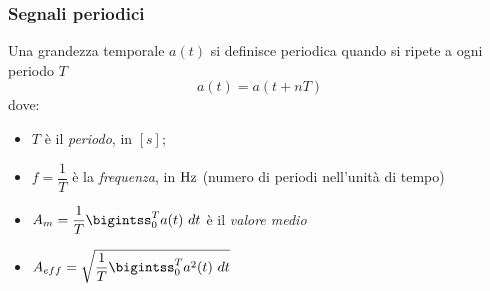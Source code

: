\documentclass{article}
\begin{document}
\subsubsection{Segnali periodici}
Una grandezza temporale $a(t)$ si definisce periodica quando si ripete a ogni periodo $T$
\[a(t)=a(t+nT) \tag*{$\forall t$}\]
dove:
\begin{itemize}
    \item $T$ è il \textit{periodo}, in $[s]$;
    \item $f=\dfrac{1}{T}$ è la \textit{frequenza}, in $\text{Hz}$ (numero di periodi nell'unità di tempo)
    \item $A_m=\dfrac{1}{T}\bigintss_0^Ta(t)\ dt$ è il \textit{valore medio}
    \item $A_{eff}=\sqrt{\dfrac{1}{T}\bigintss_0^Ta^2(t)\ dt}$
\end{itemize}
\end{document}

